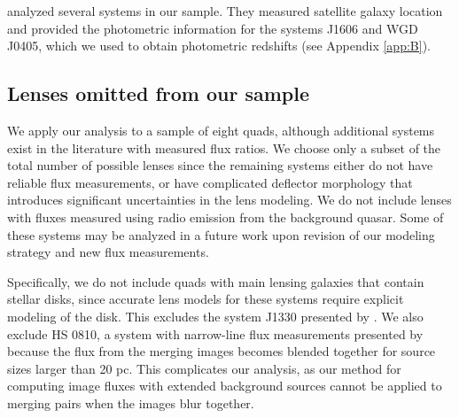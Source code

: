 \cite{Shajib++18} analyzed several systems in our sample. They measured satellite galaxy location and provided the photometric information for the systems J1606 and WGD J0405, which we used to obtain photometric redshifts (see Appendix \ref{app:B}). 

\subsection{Lenses omitted from our sample}

We apply our analysis to a sample of eight quads, although additional systems exist in the literature with measured flux ratios. We choose only a subset of the total number of possible lenses since the remaining systems either do not have reliable flux measurements, or have complicated deflector morphology that introduces significant uncertainties in the lens modeling. We do not include lenses with fluxes measured using radio emission from the background quasar. Some of these systems may be analyzed in a future work upon revision of our modeling strategy and new flux measurements. 

Specifically, we do not include quads with main lensing galaxies that contain stellar disks, since accurate lens models for these systems require explicit modeling of the disk. This excludes the system J1330 presented by \cite{Nierenberg++19}. We also exclude HS 0810, a system with narrow-line flux measurements presented by \cite{Nierenberg++19} because the flux from the merging images becomes blended together for source sizes larger than 20 pc. This complicates our analysis, as our method for computing image fluxes with extended background sources cannot be applied to merging pairs when the images blur together. 

